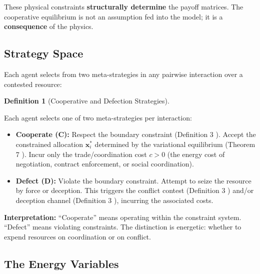 \documentclass[11pt]{article}
\theoremstyle{plain}
\theoremstyle{definition}
\newtheorem{definition}{Definition}
\theoremstyle{remark}
\let\origsubsection\subsection
\renewcommand{\subsection}{\needspace{7\baselineskip}\origsubsection}
\begin{document}
These physical constraints \textbf{structurally determine} the payoff
matrices. The cooperative equilibrium is not an assumption fed into the
model; it is a \textbf{consequence} of the physics.

\subsection{Strategy Space}\label{strategy-space}

Each agent selects from two meta-strategies in any pairwise interaction
over a contested resource:

\begin{definition}[Cooperative and Defection Strategies]
\label{def-cooperative-defection-strategies}

Each agent selects one of two meta-strategies per interaction:

\begin{itemize}
\item \textbf{Cooperate (C):} Respect the boundary constraint (Definition 3 \citep{TC-I}). Accept the constrained allocation $\mathbf{x}_i^*$ determined by the variational equilibrium (Theorem 7 \citep{TC-I}). Incur only the trade/coordination cost $c > 0$ (the energy cost of negotiation, contract enforcement, or social coordination).
\item \textbf{Defect (D):} Violate the boundary constraint. Attempt to seize the resource by force or deception. This triggers the conflict contest (Definition 3 \citep{TC-IV}) and/or deception channel (Definition 3 \citep{TC-II}), incurring the associated costs.
\end{itemize}

\end{definition}

\textbf{Interpretation:} ``Cooperate'' means operating within the
constraint system. ``Defect'' means violating constraints. The
distinction is energetic: whether to expend resources on coordination or
on conflict.

\subsection{The Energy Variables}\label{the-energy-variables}
\end{document}
